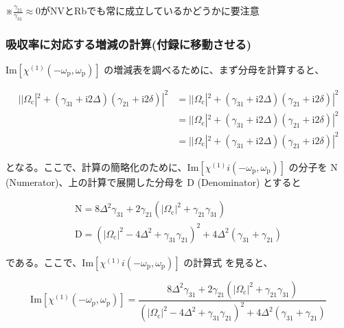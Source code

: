 \documentclass[11pt,a4paper]{ltjsarticle}
\begin{document}
{\color{red}※$\frac{\gamma_{21}}{\gamma_{31}} \approx 0$がNVとRbでも常に成立しているかどうかに要注意 }


\subsubsection{吸収率に対応する増減の計算(付録に移動させる)}

$\mathrm{Im} \left[\chi^{\left( 1 \right)}(- \omega_{\mathrm{p}},\omega_{\mathrm{p}}) \right]$ の増減表を調べるために、まず分母を計算すると、

\begin{align*}
  { | |\Omega_{\mathrm{c}}|^2 + \left( \gamma_{31} 
                    + \mathrm{i} 2 \Delta \right) \left( \gamma_{21} + \mathrm{i} 2 \delta \right)  | }^2
        &=  { | |\Omega_{\mathrm{c}}|^2 + \left( \gamma_{31} 
                    + \mathrm{i} 2 \Delta \right) \left( \gamma_{21} + \mathrm{i} 2 \delta \right)  | }^2 \\
        &=  { | |\Omega_{\mathrm{c}}|^2 + \left( \gamma_{31} 
                    + \mathrm{i} 2 \Delta \right) \left( \gamma_{21} + \mathrm{i} 2 \delta \right)  | }^2 \\
        &=  { | |\Omega_{\mathrm{c}}|^2 + \left( \gamma_{31} 
                    + \mathrm{i} 2 \Delta \right) \left( \gamma_{21} + \mathrm{i} 2 \delta \right)  | }^2
\end{align*}

となる。ここで、計算の簡略化のために、$\mathrm{Im} \left[\chi^{\left( 1 \right)}i(- \omega_{\mathrm{p}},\omega_{\mathrm{p}}) \right]$
の分子を N (Numerator)、上の計算で展開した分母を D (Denominator) とすると

\begin{gather*}
  \mathrm{N} = 8 \Delta^2 \gamma_{31} + 2 \gamma_{21} \left( |\Omega_{\mathrm{c}}|^2 + \gamma_{21} \gamma_{31} \right) \\
  \mathrm{D} = { \left( |\Omega_{\mathrm{c}}|^2 - 4 \Delta^2 + \gamma_{31} \gamma_{21} \right) }^2 + 4 \Delta^2 \left( \gamma_{31} + \gamma_{21} \right)
\end{gather*}

である。ここで、$\mathrm{Im} \left[\chi^{\left( 1 \right)}i(- \omega_{\mathrm{p}},\omega_{\mathrm{p}}) \right]$ の計算式
を見ると、

\begin{equation}
\label{Simplified absorption }
  \mathrm{Im} \left[\chi^{\left( 1 \right)}　(- \omega_{\mathrm{p}},\omega_{\mathrm{p}}) \right] 
            = \frac{ 8 \Delta^2 \gamma_{31} + 2 \gamma_{21} \left( |\Omega_{\mathrm{c}}|^2 + \gamma_{21} \gamma_{31} \right) }{ { \left( |\Omega_{\mathrm{c}}|^2 - 4 \Delta^2 + \gamma_{31} \gamma_{21} \right) }^2 + 4 \Delta^2 \left( \gamma_{31} + \gamma_{21} \right) }
\end{equation}
\end{document}
